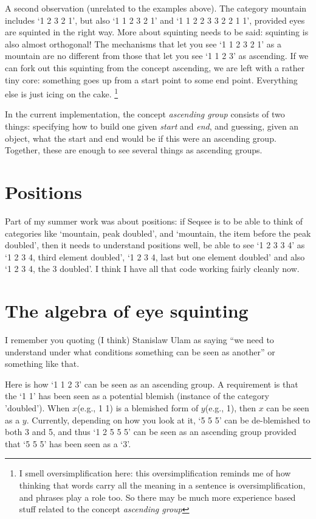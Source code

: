 \documentclass{article}
\begin{document}
A second observation (unrelated to the examples above). The category mountain includes `1 2 3 2 1', but also `1 1 2 3 2 1' and `1 1 2 2 3 3 2 2 1 1', provided eyes are squinted in the right way. More about squinting needs to be said: squinting is also almost orthogonal! The mechanisms that let you see `1 1 2 3 2 1' as a mountain are no different from those that let you see `1 1 2 3' as ascending.  If we can fork out this squinting from the concept ascending, we are left with a rather tiny core: something goes up from a start point to some end point. Everything else is just icing on the cake. \footnote{I smell oversimplification here: this oversimplification reminds me of how thinking that words carry all the meaning in a sentence is oversimplification, and phrases play a role too. So there may be much more experience based stuff related to the concept \textit{ascending group}}

In the current implementation, the concept \textit{ascending group} consists of two things: specifying how to build one given \textit{start} and \textit{end}, and guessing, given an object, what the start and end would be if this were an ascending group. Together, these are enough to see several things as ascending groups.

\section*{Positions} Part of my summer work was about positions: if Seqsee is to be able to think of categories like `mountain, peak doubled', and `mountain, the item before the peak doubled', then it needs to understand positions well, be able to see `1 2 3 3 4' as `1 2 3 4, third element doubled', `1 2 3 4, last but one element doubled' and also `1 2 3 4, the 3 doubled'. I think I have all that code working fairly cleanly now.

\section*{The algebra of eye squinting}

I remember you quoting (I think) Stanislaw Ulam as saying ``we need to understand under what conditions something can be seen as another'' or something like that.

Here is how `1 1 2 3' can be seen as an ascending group. A requirement is that the `1 1' has been seen as a potential blemish (instance of the category 'doubled'). When $x$(e.g., 1 1) is a blemished form of $y$(e.g., 1), then $x$ can be seen as a $y$. Currently, depending on how you look at it, `5 5 5' can be de-blemished to both 3 and 5, and thus `1 2 5 5 5' can be seen as an ascending group provided that `5 5 5' has been seen as a `3'.
\end{document}
